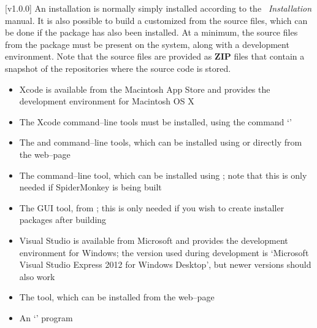 [v1.0.0]
%
An \mplusm{} installation is normally simply installed according to the
\emph{\MMM{}~Installation} manual.
It is also possible to build a customized \mplusm{} from the source files, which can be
done if the  package has also been installed.
At a minimum, the source files from the  package must be present on the
system, along with a  development environment.
Note that the source files are provided as \textbf{ZIP} files that contain a snapshot of
the  repositories where the source code is stored.
\tertiaryEnd{}
\begin{itemize}
\item Xcode is available from the Macintosh App Store and provides the 
development environment for Macintosh OS X
\item The Xcode command--line tools must be installed, using the command
`'
\item The  and  command--line tools, which can be installed
using  or directly from the web--page
\item The  command--line tool, which can be installed using
; note that this is only needed if SpiderMonkey is being built
\item The  GUI tool, from
;
this is only needed if you wish to create installer packages after building \mplusm
\end{itemize}
\tertiaryEnd{}
\begin{itemize}
\item Visual Studio is available from Microsoft and provides the 
development environment for Windows; the version used during development is
`Microsoft Visual Studio Express 2012 for Windows Desktop', but newer versions should also
work
\item The  tool, which can be installed from the web--page
\item An `' program
\end{itemize}
